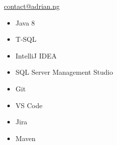 \documentclass[letterpaper,11pt]{article}
\makeatletter
\newcommand{\resumeSubheading}[4]{
	\vspace{-1pt}\item
	\begin{tabular*}{0.97\textwidth}{l@{\extracolsep{\fill}}r}
		\textbf{#1} & #2 \\
		\textit{\small#3} & \textit{\small #4} \\
	\end{tabular*}\vspace{-5pt}
}
\newcommand{\resumeSubHeadingListStart}{\begin{itemize}[leftmargin=*]}
\makeatother
\begin{document}
\begin{minipage}[c]{0.4\linewidth}
	\begin{description}[style=nextline]
		\item[Email]
		      \href{mailto:contact@adrian.ng}{contact@adrian.ng}
		\item[Website]
		\item[Languages]
		      \begin{itemize}
			      \item Java 8
			      \item T-SQL
		      \end{itemize}
		\item[Software]
		      \begin{itemize}
			      \item IntelliJ IDEA
			      \item SQL Server Management Studio
			      \item Git
			      \item VS Code
			      \item Jira
			      \item Maven
		      \end{itemize}
	\end{description}
\end{minipage}


\end{document}
